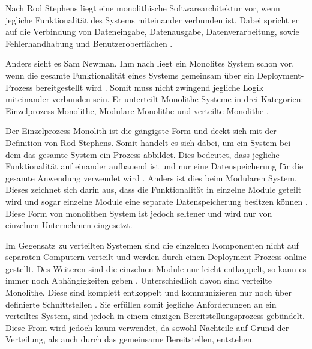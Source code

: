 Nach Rod Stephens liegt eine monolithische Softwarearchitektur vor, wenn jegliche Funktionalität des Systems miteinander verbunden ist. Dabei spricht er auf die Verbindung von Dateneingabe, Datenausgabe, Datenverarbeitung, sowie Fehlerhandhabung und Benutzeroberflächen \parencite[vgl.][S. 94]{stephens_beginning_2015}.

Anders sieht es Sam Newman. Ihm nach liegt ein Monolites System schon vor, wenn die gesamte Funktionalität eines Systems gemeinsam über ein Deployment-Prozess bereitgestellt wird \parencite[vgl.][Kap. 2.2]{newman_monolith_2019}. Somit muss nicht zwingend jegliche Logik miteinander verbunden sein. Er unterteilt Monolithe Systeme in drei Kategorien: Einzelprozess Monolithe, Modulare Monolithe und verteilte Monolithe \parencite[vgl.][Kap. 2.2]{newman_monolith_2019}.

Der Einzelprozess Monolith ist die gängigste Form und deckt sich mit der Definition von Rod Stephens. Somit handelt es sich dabei, um ein System bei dem das gesamte System ein Prozess abbildet. Dies bedeutet, dass jegliche Funktionalität auf einander aufbauend ist und nur eine Datenspeicherung für die gesamte Anwendung verwendet wird \parencite[vgl.][Kap. 2.2.1]{newman_monolith_2019}.
Anders ist dies beim Modularen System. Dieses zeichnet sich darin aus, dass die Funktionalität in einzelne Module geteilt wird und sogar einzelne Module eine separate Datenspeicherung besitzen können \parencite[vgl.][Kap. 2.2.2]{newman_monolith_2019}. Diese Form von monolithen System ist jedoch seltener und wird nur von einzelnen Unternehmen eingesetzt.


Im Gegensatz zu verteilten Systemen sind die einzelnen Komponenten nicht auf separaten Computern verteilt und werden durch einen Deployment-Prozess online gestellt. Des Weiteren sind die einzelnen Module nur leicht entkoppelt, so kann es immer noch Abhängigkeiten geben \parencite[vgl.][Kap. 2.2.2]{newman_monolith_2019}. Unterschiedlich davon sind verteilte Monolithe. Diese sind komplett entkoppelt und kommunizieren nur noch über definierte Schnittstellen \parencite[vlg.][S. 116]{starke_effektive_2015}. Sie erfüllen somit jegliche Anforderungen an ein verteiltes System, sind jedoch in einem einzigen Bereitstellungsprozess gebündelt. Diese From wird jedoch kaum verwendet, da sowohl Nachteile auf Grund der Verteilung, als auch durch das gemeinsame Bereitstellen, entstehen.


